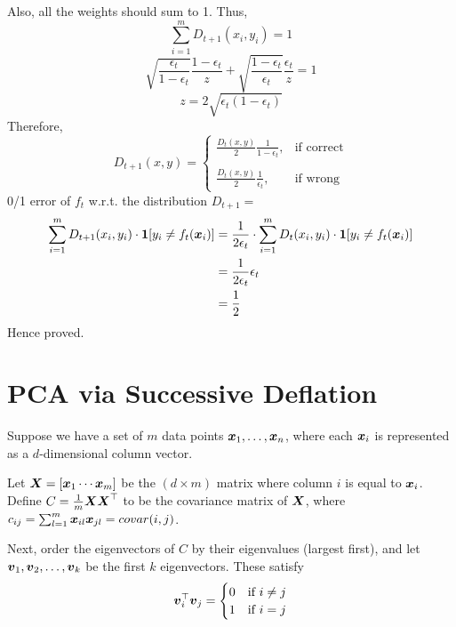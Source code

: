 \documentclass{article}
\begin{document}
\begin{mdframed}[backgroundcolor=lightgray]
Also, all the weights should sum to 1. Thus,
\begin{equation}
\sum_{i=1}^{m}  D_{t+1}(x_i,y_i) = 1
\end{equation}
\begin{equation}
\sqrt{\frac{\epsilon_{t}}{1-\epsilon_{t}}} \frac{1-\epsilon_{t}}{z} + \sqrt{\frac{1-\epsilon_{t}}{\epsilon_{t}}} \frac{\epsilon_{t}}{z} = 1
\end{equation}
\begin{equation}
z = 2 \sqrt{\epsilon_{t} (1-\epsilon_t)}
\end{equation}
Therefore,
  \begin{equation}
     D_{t+1}(x,y) = 
    \begin{cases}
       \frac{D_{t}(x,y)}{2} \frac{1}{1-\epsilon_{t}}, & \text{if correct} \\\\
      \frac{D_{t}(x,y)}{2} \frac{1}{\epsilon_{t}}, & \text{if wrong}
    \end{cases}
  \end{equation}
   0/1 error of $f_t$ w.r.t.  the distribution $D_{t+1} = $
   \begin{align}
       \sum_{i=1}^{m} D_{t+1} (x_i, y_i) \cdot \boldsymbol{1}[y_i \neq f_t(\boldsymbol{x}_i)] &=\frac{1}{2 \epsilon_t} \cdot \sum_{i=1}^m D_{t} (x_i, y_i) \cdot \boldsymbol{1}[y_i \neq f_t(\boldsymbol{x}_i)]\\
       &= \frac{1}{2 \epsilon_t} \epsilon_t\\
       &= \frac{1}{2}
   \end{align}
   Hence proved.
\end{mdframed}


\section{PCA via Successive Deflation}

Suppose we have a set of $m$ data points $\boldsymbol{x}_1, \ldots, \boldsymbol{x}_n$, where each $\boldsymbol{x}_i$ is represented as a $d$-dimensional column vector. 

Let $\boldsymbol{X} = [ \boldsymbol{x}_1  \cdots   \boldsymbol{x}_m]$ be the $(d \times m)$ matrix where column $i$ is equal to $\boldsymbol{x}_i$. Define $C = \frac{1}{m} \boldsymbol{X} \boldsymbol{X}^\top$ to be the covariance matrix of $\boldsymbol{X}$, where $c_{ij} = \sum_{l=1}^{m} \boldsymbol{x}_{il} \boldsymbol{x}_{jl} = covar(i,j)$.

Next, order the eigenvectors of $C$ by their eigenvalues (largest first), and let $\boldsymbol{v}_1, \boldsymbol{v}_2, \ldots, \boldsymbol{v}_k$ be the first $k$ eigenvectors. These satisfy
\[ 
\boldsymbol{v}_i^\top \boldsymbol{v}_j =
\begin{cases}
  0 & \mbox{if } i \neq j \\
  1 & \mbox{if } i = j
\end{cases}
\]
\end{document}
